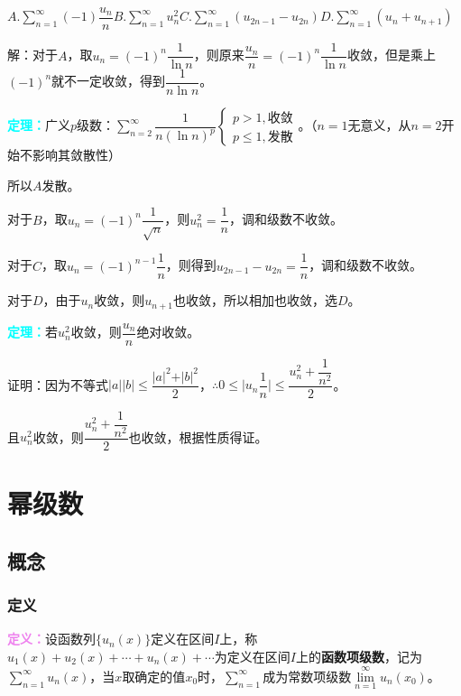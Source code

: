 \documentclass[UTF8, 12pt]{ctexart}
\begin{document}
$A.\sum\limits_{n=1}^\infty(-1)\dfrac{u_n}{n}$\qquad$B.\sum\limits_{n=1}^\infty u_n^2$\qquad$C.\sum\limits_{n=1}^\infty(u_{2n-1}-u_{2n})$\qquad$D.\sum\limits_{n=1}^\infty(u_n+u_{n+1})$

解：对于$A$，取$u_n=(-1)^n\dfrac{1}{\ln n}$，则原来$\dfrac{u_n}{n}=(-1)^n\dfrac{1}{\ln n}$收敛，但是乘上$(-1)^n$就不一定收敛，得到$\dfrac{1}{n\ln n}$。

\textcolor{aqua}{\textbf{定理：}}广义$p$级数：$\sum\limits_{n=2}^\infty\dfrac{1}{n(\ln n)^p}\left\{\begin{array}{l}
    p>1, \text{收敛} \\
    p\leqslant1, \text{发散}
\end{array}\right.$。（$n=1$无意义，从$n=2$开始不影响其敛散性）

所以$A$发散。

对于$B$，取$u_n=(-1)^n\dfrac{1}{\sqrt{n}}$，则$u_n^2=\dfrac{1}{n}$，调和级数不收敛。

对于$C$，取$u_n=(-1)^{n-1}\dfrac{1}{n}$，则得到$u_{2n-1}-u_{2n}=\dfrac{1}{n}$，调和级数不收敛。

对于$D$，由于$u_n$收敛，则$u_{n+1}$也收敛，所以相加也收敛，选$D$。

\textcolor{aqua}{\textbf{定理：}}若$u_n^2$收敛，则$\dfrac{u_n}{n}$绝对收敛。

证明：因为不等式$\vert a\vert\vert b\vert\leqslant\dfrac{\vert a\vert^2+\vert b\vert^2}{2}$，$\therefore0\leqslant\vert u_n\dfrac{1}{n}\vert\leqslant\dfrac{u_n^2+\dfrac{1}{n^2}}{2}$。

且$u_n^2$收敛，则$\dfrac{u_n^2+\dfrac{1}{n^2}}{2}$也收敛，根据性质得证。

\section{幂级数}

\subsection{概念}

\subsubsection{定义}

\textcolor{violet}{\textbf{定义：}}设函数列$\{u_n(x)\}$定义在区间$I$上，称$u_1(x)+u_2(x)+\cdots+u_n(x)+\cdots$为定义在区间$I$上的\textbf{函数项级数}，记为$\sum\limits_{n=1}^\infty u_n(x)$，当$x$取确定的值$x_0$时，$\sum\limits_{n=1}^\infty$成为常数项级数$\lim\limits_{n=1}^\infty u_n(x_0)$。
\end{document}
